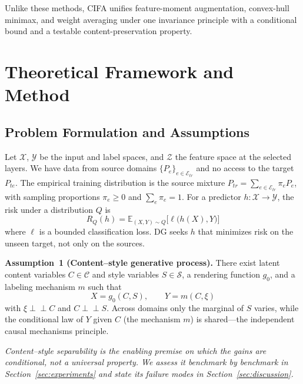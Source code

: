 \documentclass[electronics,article,submit,moreauthors]{Definitions/mdpi}
\begin{document}
Unlike these methods, CIFA unifies feature-moment augmentation, convex-hull minimax, and weight averaging under one invariance principle with a conditional bound and a testable content-preservation property.

\section{Theoretical Framework and Method}

\subsection{Problem Formulation and Assumptions}

Let $\mathcal{X}$, $\mathcal{Y}$ be the input and label spaces, and $\mathcal{Z}$ the feature space at the selected layers. We have data from source domains $\{P_e\}_{e\in\mathcal{E}_{tr}}$ and no access to the target $P_{te}$. The empirical training distribution is the source mixture $P_{tr}=\sum_{e\in\mathcal{E}_{tr}}\pi_e P_e$, with sampling proportions $\pi_e\ge0$ and $\sum_e\pi_e=1$. For a predictor $h:\mathcal{X}\to\mathcal{Y}$, the risk under a distribution $Q$ is
\begin{equation}
R_Q(h)=\mathbb{E}_{(X,Y)\sim Q}\big[\ell\big(h(X),Y\big)\big]
\end{equation}
where $\ell$ is a bounded classification loss. DG seeks $h$ that minimizes risk on the unseen target, not only on the sources.

\noindent\textbf{Assumption~1 (Content--style generative process).} There exist latent content variables $C\in\mathcal{C}$ and style variables $S\in\mathcal{S}$, a rendering function $g_0$, and a labeling mechanism $m$ such that
\begin{equation}
X=g_0(C,S),\qquad Y=m(C,\xi)
\end{equation}
with $\xi\perp\!\!\!\perp C$ and $C\perp\!\!\!\perp S$. Across domains only the marginal of $S$ varies, while the conditional law of $Y$ given $C$ (the mechanism $m$) is shared---the independent causal mechanisms principle.

\noindent\textit{Content--style separability is the enabling premise on which the gains are conditional, not a universal property. We assess it benchmark by benchmark in Section~\ref{sec:experiments} and state its failure modes in Section~\ref{sec:discussion}.}
\end{document}
